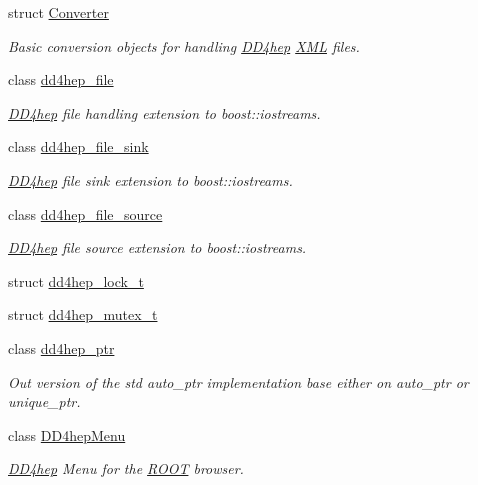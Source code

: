 \begin{DoxyCompactItemize}
\item 
struct \hyperlink{struct_d_d4hep_1_1_converter}{Converter}
\begin{DoxyCompactList}\small\item\em Basic conversion objects for handling \hyperlink{namespace_d_d4hep}{D\+D4hep} \hyperlink{namespace_d_d4hep_1_1_x_m_l}{X\+ML} files. \end{DoxyCompactList}\item 
class \hyperlink{class_d_d4hep_1_1dd4hep__file}{dd4hep\+\_\+file}
\begin{DoxyCompactList}\small\item\em \hyperlink{namespace_d_d4hep}{D\+D4hep} file handling extension to boost\+::iostreams. \end{DoxyCompactList}\item 
class \hyperlink{class_d_d4hep_1_1dd4hep__file__sink}{dd4hep\+\_\+file\+\_\+sink}
\begin{DoxyCompactList}\small\item\em \hyperlink{namespace_d_d4hep}{D\+D4hep} file sink extension to boost\+::iostreams. \end{DoxyCompactList}\item 
class \hyperlink{class_d_d4hep_1_1dd4hep__file__source}{dd4hep\+\_\+file\+\_\+source}
\begin{DoxyCompactList}\small\item\em \hyperlink{namespace_d_d4hep}{D\+D4hep} file source extension to boost\+::iostreams. \end{DoxyCompactList}\item 
struct \hyperlink{struct_d_d4hep_1_1dd4hep__lock__t}{dd4hep\+\_\+lock\+\_\+t}
\item 
struct \hyperlink{struct_d_d4hep_1_1dd4hep__mutex__t}{dd4hep\+\_\+mutex\+\_\+t}
\item 
class \hyperlink{class_d_d4hep_1_1dd4hep__ptr}{dd4hep\+\_\+ptr}
\begin{DoxyCompactList}\small\item\em Out version of the std auto\+\_\+ptr implementation base either on auto\+\_\+ptr or unique\+\_\+ptr. \end{DoxyCompactList}\item 
class \hyperlink{class_d_d4hep_1_1_d_d4hep_menu}{D\+D4hep\+Menu}
\begin{DoxyCompactList}\small\item\em \hyperlink{namespace_d_d4hep}{D\+D4hep} Menu for the \hyperlink{namespace_r_o_o_t}{R\+O\+OT} browser. \end{DoxyCompactList}\item 

\end{DoxyCompactItemize}
